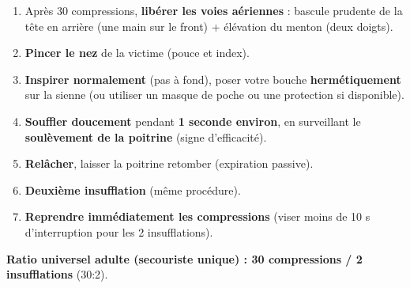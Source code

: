 \documentclass[11pt]{article}
\begin{document}
\begin{methode}
\begin{enumerate}
    \item Après 30 compressions, \textbf{libérer les voies aériennes} : bascule prudente de la tête en arrière (une main sur le front) + élévation du menton (deux doigts).
    \item \textbf{Pincer le nez} de la victime (pouce et index).
    \item \textbf{Inspirer normalement} (pas à fond), poser votre bouche \textbf{hermétiquement} sur la sienne (ou utiliser un masque de poche ou une protection si disponible).
    \item \textbf{Souffler doucement} pendant \textbf{1 seconde environ}, en surveillant le \textbf{soulèvement de la poitrine} (signe d'efficacité).
    \item \textbf{Relâcher}, laisser la poitrine retomber (expiration passive).
    \item \textbf{Deuxième insufflation} (même procédure).
    \item \textbf{Reprendre immédiatement les compressions} (viser moins de 10 s d'interruption pour les 2 insufflations).
\end{enumerate}
\textbf{Ratio universel adulte (secouriste unique) : 30 compressions / 2 insufflations} (30:2).
\end{methode}
\end{document}
